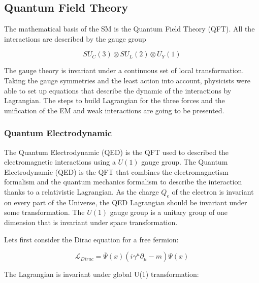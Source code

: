     
    \begin{figure}[h]
    \centering
    \caption{}
    \label{fig:partInterac}
    \end{figure}
      
    \subsection{Quantum Field Theory}

	The mathematical basis of the SM is the Quantum Field Theory (QFT). All the interactions are described by the gauge group 
    
      \begin{equation}
    	SU_C(3) \otimes SU_L(2) \otimes U_Y(1)
	  \end{equation}
    
    The gauge theory is invariant under a continuous set of local transformation.
    Taking the gauge symmetries and the least action into account, physicists were able to set up equations that describe the dynamic of the interactions by Lagrangian.
    The steps to build Lagrangian for the three forces and the unification of the EM and weak interactions are going to be presented. 
    
      \subsubsection{Quantum Electrodynamic}

      The Quantum Electrodynamic (QED) is the QFT used to described the electromagnetic interactions using a $U(1)$ gauge group.
     The Quantum Electrodynamic (QED) is the QFT that combines the electromagnetism formalism and the quantum mechanics formalism to describe the interaction thanks to a relativistic Lagrangian.
     As the charge $Q_e$ of the electron is invariant on every part of the Universe, the QED Lagrangian should be invariant under some transformation.
     The $U(1)$ gauge group is a unitary group of one dimension that is invariant under space transformation.

      Lets first consider the Dirac equation for a free fermion:
      
      \begin{equation}
        \mathcal{L}_{Dirac} = \overline{\Psi}\left(x\right) \left(i \gamma^{\mu}\partial_{\mu} - m \right) \Psi\left(x\right)
      \end{equation}

      The Lagrangian is invariant under global U(1) transformation:

